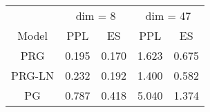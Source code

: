 
\begin{tabular}{ccccc}
\toprule
\multicolumn{1}{c}{ } & \multicolumn{2}{c}{dim = 8} & \multicolumn{2}{c}{dim = 47} \\
\cmidrule(l{3pt}r{3pt}){2-3} \cmidrule(l{3pt}r{3pt}){4-5}
Model & PPL & ES & PPL & ES\\
\midrule
PRG & 0.195 & 0.170 & 1.623 & 0.675\\
PRG-LN & 0.232 & 0.192 & 1.400 & 0.582\\
PG & 0.787 & 0.418 & 5.040 & 1.374\\
\bottomrule
\end{tabular}